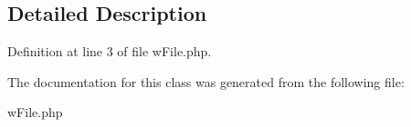 \subsection{Detailed Description}


Definition at line 3 of file wFile.php.



The documentation for this class was generated from the following file:\begin{DoxyCompactItemize}
\item 
wFile.php\end{DoxyCompactItemize}
